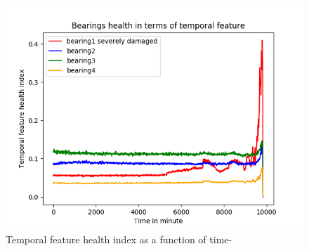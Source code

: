 \documentclass[../Main/thesis.tex]{subfiles}
\begin{document}
\begin{figure}[H] %
   \centering
   \includegraphics[width=5.3in]{../fig/temporal_feature_health.png} 
   \caption{Temporal feature health index as a function of time-}
   \label{fig:temporal_feature_health}
\end{figure}




















\blankpage
\end{document}
